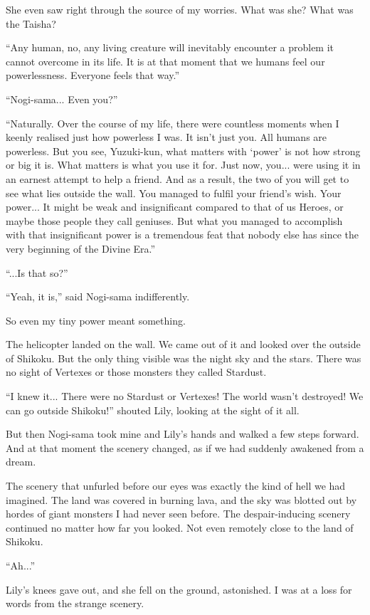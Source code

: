 She even saw right through the source of my worries. What was she? What was the Taisha?

``Any human, no, any living creature will inevitably encounter a problem it cannot overcome in its life. It is at that moment that we humans feel our powerlessness. Everyone feels that way.''

``Nogi-sama... Even you?''

``Naturally. Over the course of my life, there were countless moments when I keenly realised just how powerless I was. It isn't just you. All humans are powerless. But you see, Yuzuki-kun, what matters with `power' is not how strong or big it is. What matters is what you use it for. Just now, you... were using it in an earnest attempt to help a friend. And as a result, the two of you will get to see what lies outside the wall. You managed to fulfil your friend's wish. Your power... It might be weak and insignificant compared to that of us Heroes, or maybe those people they call geniuses. But what you managed to accomplish with that insignificant power is a tremendous feat that nobody else has since the very beginning of the Divine Era.''

``...Is that so?''

``Yeah, it is,'' said Nogi-sama indifferently.

So even my tiny power meant something.

The helicopter landed on the wall. We came out of it and looked over the outside of Shikoku. But the only thing visible was the night sky and the stars. There was no sight of Vertexes or those monsters they called Stardust.

``I knew it... There were no Stardust or Vertexes! The world wasn't destroyed! We can go outside Shikoku!'' shouted Lily, looking at the sight of it all.

But then Nogi-sama took mine and Lily's hands and walked a few steps forward. And at that moment the scenery changed, as if we had suddenly awakened from a dream.

The scenery that unfurled before our eyes was exactly the kind of hell we had imagined. The land was covered in burning lava, and the sky was blotted out by hordes of giant monsters I had never seen before. The despair-inducing scenery continued no matter how far you looked. Not even remotely close to the land of Shikoku.

``Ah...''

Lily's knees gave out, and she fell on the ground, astonished. I was at a loss for words from the strange scenery.

